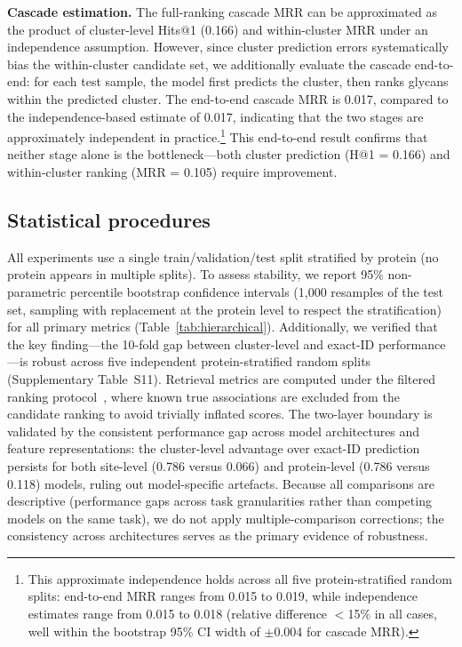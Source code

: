 \documentclass[11pt,a4paper]{article}
\begin{document}
\textbf{Cascade estimation.} The full-ranking cascade MRR can be approximated as
the product of cluster-level Hits@1 (0.166) and within-cluster MRR under an
independence assumption. However, since cluster prediction errors systematically
bias the within-cluster candidate set, we additionally evaluate the cascade
end-to-end: for each test sample, the model first predicts the cluster, then
ranks glycans within the predicted cluster. The end-to-end cascade MRR is 0.017,
compared to the independence-based estimate of 0.017, indicating that the two
stages are approximately independent in practice.\footnote{This approximate
independence holds across all five protein-stratified random splits: end-to-end
MRR ranges from 0.015 to 0.019, while independence estimates range from 0.015
to 0.018 (relative difference $<$15\% in all cases, well within the bootstrap
95\% CI width of $\pm$0.004 for cascade MRR).} This end-to-end result confirms
that neither stage alone is the bottleneck---both cluster prediction (H@1 = 0.166)
and within-cluster ranking (MRR = 0.105) require improvement.

\subsection{Statistical procedures}

All experiments use a single train/validation/test split stratified by protein
(no protein appears in multiple splits). To assess stability, we report 95\%
non-parametric percentile bootstrap confidence intervals (1,000 resamples of the
test set, sampling with replacement at the protein level to respect the
stratification) for all primary metrics (Table~\ref{tab:hierarchical}). Additionally, we verified that the key finding---the 10-fold gap between
cluster-level and exact-ID performance---is robust across five independent
protein-stratified random splits (Supplementary Table~S11).
Retrieval metrics are computed under the
filtered ranking protocol~\cite{bordes2013}, where known true associations are
excluded from the candidate ranking to avoid trivially inflated scores.
The two-layer boundary is validated by the consistent
performance gap across model architectures and feature representations: the
cluster-level advantage over exact-ID prediction persists for both site-level
(0.786 versus 0.066) and protein-level (0.786 versus 0.118) models, ruling out
model-specific artefacts. Because all comparisons are descriptive (performance
gaps across task granularities rather than competing models on the same task), we
do not apply multiple-comparison corrections; the consistency across architectures
serves as the primary evidence of robustness.
\end{document}
